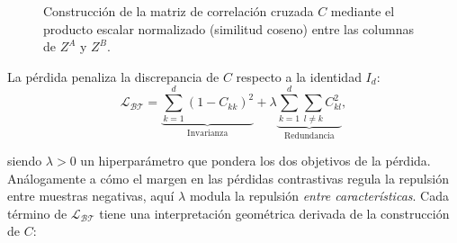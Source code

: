 \begin{figure}[H]
{
    }
    \caption{Construcción de la matriz de correlación cruzada $C$ mediante el producto escalar normalizado (similitud coseno) entre las columnas de $Z^A$ y $Z^B$.}
    \label{fig:cross_corr_matrices_horizontal_compact}
\end{figure}

\begin{definition}
La pérdida penaliza la discrepancia de $C$ respecto a la identidad $I_d$:
\begin{equation}
\mathcal{L}_{\mathcal{BT}} = \underbrace{\sum_{k=1}^{d} (1 - C_{kk})^2}_{\text{Invarianza}} + \lambda \underbrace{\sum_{k=1}^{d} \sum_{l \neq k} C_{kl}^2}_{\text{Redundancia}},
\end{equation}
\end{definition} 
\noindent siendo $\lambda > 0$ un hiperparámetro que pondera los dos objetivos de la pérdida. Análogamente a cómo el margen en las pérdidas contrastivas regula la repulsión entre muestras negativas, aquí $\lambda$ modula la repulsión \textit{entre características}. Cada término de $\mathcal{L}_{\mathcal{BT}}$ tiene una interpretación geométrica derivada de la construcción de $C$:

